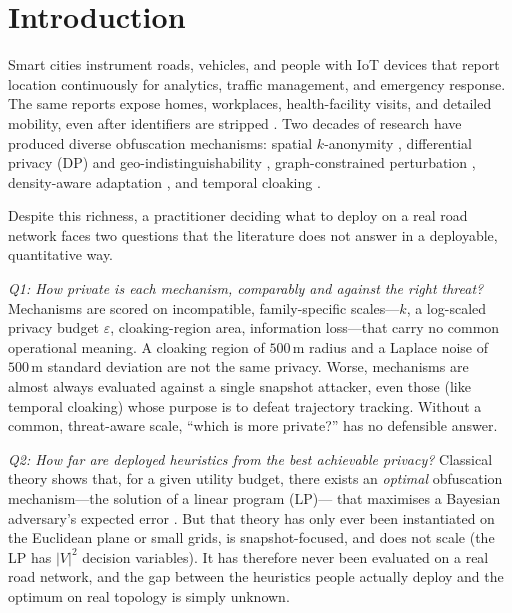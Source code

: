 \documentclass[11pt]{article}
\begin{document}
\section{Introduction}
\label{sec:intro}
Smart cities instrument roads, vehicles, and people with IoT
devices that report location continuously for analytics, traffic management, and
emergency response. The same reports expose homes, workplaces, health-facility
visits, and detailed mobility, even after identifiers are stripped
\cite{sweeney2002,gruteser2003}. Two decades of research have produced diverse
obfuscation mechanisms: spatial $k$-anonymity \cite{sweeney2002,gruteser2003,
mokbel2006}, differential privacy (DP) and geo-indistinguishability
\cite{dwork2006,andres2013}, graph-constrained perturbation \cite{bordenabe2014},
density-aware adaptation \cite{niu2014}, and temporal cloaking \cite{gruteser2003}.

Despite this richness, a practitioner deciding what to deploy on a real road
network faces two questions that the literature does not answer in a deployable,
quantitative way.

\emph{Q1: How private is each mechanism, comparably and against the right
threat?} Mechanisms are scored on incompatible, family-specific scales---$k$, a
log-scaled privacy budget $\varepsilon$, cloaking-region area, information
loss---that carry no common operational meaning. A cloaking region of $500$\,m
radius and a Laplace noise of $500$\,m standard deviation are not the same
privacy. Worse, mechanisms are almost always evaluated against a single snapshot
attacker, even those (like temporal cloaking) whose purpose is to defeat
trajectory tracking. Without a common, threat-aware scale, ``which is more
private?'' has no defensible answer.

\emph{Q2: How far are deployed heuristics from the best achievable privacy?}
Classical theory shows that, for a given utility budget, there exists an
\emph{optimal} obfuscation mechanism---the solution of a linear program (LP)---
that maximises a Bayesian adversary's expected error \cite{shokri2012,
shokri2015pets,bordenabe2014}. But that theory has only ever been instantiated on
the Euclidean plane or small grids, is snapshot-focused, and does not scale (the
LP has $|V|^2$ decision variables). It has therefore never been evaluated on a
real road network, and the gap between the heuristics people actually deploy and
the optimum on real topology is simply unknown.
\end{document}
